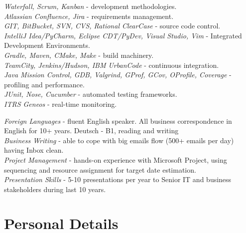 \documentclass[10pt]{article} %
\begin{document}
{
\textit{Waterfall, Scrum, Kanban} - development methodologies.\\
\textit{Atlassian Confluence, Jira} - requirements management.\\
\textit{GIT, BitBucket, SVN, CVS, Rational ClearCase} - source code control.\\
\textit{IntelliJ Idea/PyCharm, Eclipse CDT/PyDev, Visual Studio, Vim} - Integrated Development Environments.\\
\textit{Gradle, Maven, CMake, Make} - build machinery.\\
\textit{TeamCity, Jenkins/Hudson, IBM UrbanCode} - continuous integration.\\
\textit{Java Mission Control, GDB, Valgrind, GProf, GCov, OProfile, Coverage} - profiling and performance.\\ 
\textit{JUnit, Nose, Cucumber} - automated testing frameworks.\\
\textit{ITRS Geneos} - real-time monitoring.
}


{
\textit{Foreign Languages} - fluent English speaker. All business correspondence in English for 10+ years. Deutsch - B1, reading and writing \\
\textit{Business Writing} - able to cope with big emails flow (500+ emails per day) having Inbox clean. \\
\textit{Project Management} - hands-on experience with Microsoft Project, using sequencing and resource assignment for target date estimation.\\
\textit{Presentation Skills} - 5-10 presentations per year to Senior IT and business stakeholders during last 10 years.
}


\section{Personal Details}

\end{document}
